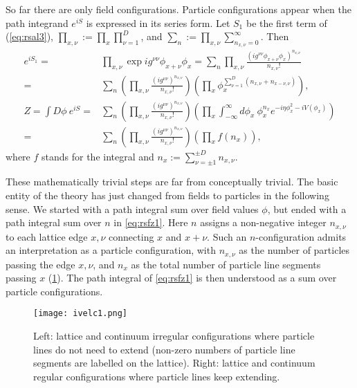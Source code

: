 \documentclass[12pt]{article}
\theoremstyle{definition}
\begin{document}
So far there are only field configurations. Particle configurations appear when the path integrand $e^{iS}$ is expressed in its series form. Let $S_{1}$ be the first term of (\ref{eq:rsal3}), $\prod_{x,\nu}:= \prod_x \prod_{\nu=1}^D$, and $\sum_{n}:=\prod_{x,\nu} \sum_{n_{x,\nu}=0}^\infty$. Then
\begin{align}
e^{iS_{1}}=&\prod_{x,\nu} \exp{ i g^{\nu\nu} \phi_{x+\nu} \phi_{x} }
=\sum_{n}\prod_{x,\nu} \frac{( i g^{\nu\nu}\phi_{x+\nu} \phi_{x})^{n_{x,\nu}} }{n_{x,\nu}!} 
\\
=&\sum_{n}
(\prod_{x,\nu}\frac{( i g^{\nu\nu})^{n_{x,\nu}}}{n_{x,\nu}! })
(\prod_{x} \phi_x^{\sum_{\nu=1}^D(n_{x,\nu}+n_{x-\nu,\nu})}),
\\
Z=\int D\phi ~ e^{iS}=& \sum_{n} (\prod_{x,\nu} \frac{( i g^{\nu\nu})^{n_{x,\nu}}}{n_{x,\nu}!}) (\prod_{x} \int_{-\infty}^\infty d\phi_x ~\phi_x^{n_x} e^{-i \eta \phi_x^2-i V(\phi_x)}) \label{eq:rsfz}
\\
=& \sum_{n} (\prod_{x,\nu} \frac{( i g^{\nu\nu})^{n_{x,\nu}}}{n_{x,\nu}!}) (\prod_{x} f(n_x)),
\label{eq:rsfz1}
\end{align}
where $f$ stands for the integral and $n_x:=\sum_{\nu=\pm 1}^{\pm D} n_{x,\nu}$.

These mathematically trivial steps are far from conceptually trivial. The basic entity of the theory has just changed from fields to particles in the following sense. We started with a path integral sum over field values $\phi$, but ended with a path integral sum over $n$ in \eqref{eq:rsfz1}. Here $n$ assigns a non-negative integer $n_{x,\nu}$ to each lattice edge $x,\nu$ connecting $x$ and $x+\nu$. Such an $n$-configuration admits an interpretation as a particle configuration, with $n_{x,\nu}$ as the number of particles passing the edge $x,\nu$, and $n_x$ as the total number of particle line segments passing $x$ (\cref{fig:ivelc1}). %
The path integral of \eqref{eq:rsfz1} is then understood as a sum over particle configurations.

\begin{figure}%
    \centering
    \texttt{[image: ivelc1.png]}
    \caption{Left: lattice and continuum irregular configurations where particle lines do not need to extend (non-zero numbers of particle line segments are labelled on the lattice). Right: lattice and continuum regular configurations where particle lines keep extending.}
    \label{fig:ivelc1}
\end{figure} 
\end{document}
